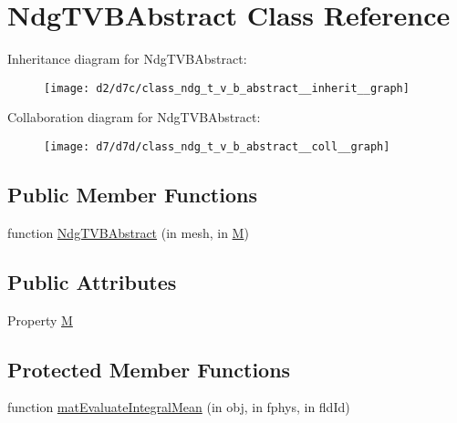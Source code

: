 \hypertarget{class_ndg_t_v_b_abstract}{}\section{Ndg\+T\+V\+B\+Abstract Class Reference}
\label{class_ndg_t_v_b_abstract}


Inheritance diagram for Ndg\+T\+V\+B\+Abstract\+:
\nopagebreak
\begin{figure}[H]
\begin{center}
\leavevmode
\texttt{[image: d2/d7c/class\_ndg\_t\_v\_b\_abstract\_\_inherit\_\_graph]}
\end{center}
\end{figure}


Collaboration diagram for Ndg\+T\+V\+B\+Abstract\+:
\nopagebreak
\begin{figure}[H]
\begin{center}
\leavevmode
\texttt{[image: d7/d7d/class\_ndg\_t\_v\_b\_abstract\_\_coll\_\_graph]}
\end{center}
\end{figure}
\subsection*{Public Member Functions}
\begin{DoxyCompactItemize}
\item 
function \hyperlink{class_ndg_t_v_b_abstract_aacefea34c787930395975e01d21fe139}{Ndg\+T\+V\+B\+Abstract} (in mesh, in \hyperlink{class_ndg_t_v_b_abstract_abaf02fa904da94fd6c6b4ca3fb65010c}{M})
\end{DoxyCompactItemize}
\subsection*{Public Attributes}
\begin{DoxyCompactItemize}
\item 
Property \hyperlink{class_ndg_t_v_b_abstract_abaf02fa904da94fd6c6b4ca3fb65010c}{M}
\end{DoxyCompactItemize}
\subsection*{Protected Member Functions}
\begin{DoxyCompactItemize}
\item 
function \hyperlink{class_ndg_t_v_b_abstract_a90f9d03c354c95e26004134b4667713e}{mat\+Evaluate\+Integral\+Mean} (in obj, in fphys, in fld\+Id)
\end{DoxyCompactItemize}
